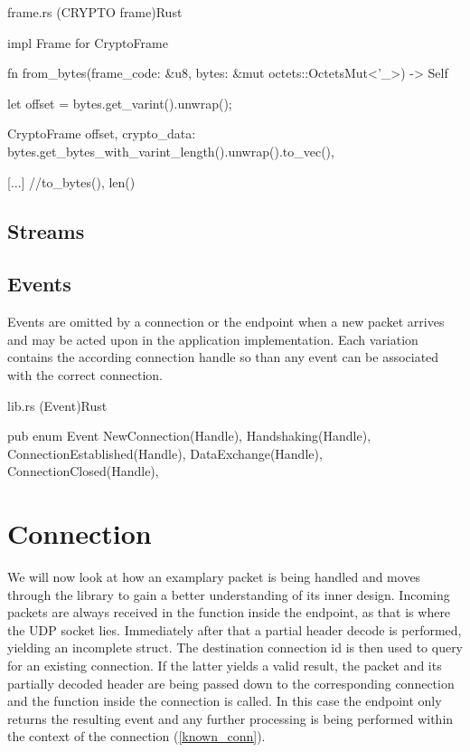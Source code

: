 \begin{codeblock}{frame.rs (CRYPTO frame)}{Rust}
    \begin{rustcode}
        impl Frame for CryptoFrame {
            fn from_bytes(frame_code: &u8, bytes: &mut octets::OctetsMut<'_>) -> Self {
                let offset = bytes.get_varint().unwrap();

                CryptoFrame {
                    offset,
                    crypto_data: bytes.get_bytes_with_varint_length().unwrap().to_vec(),
                }
            }

            [...] //to_bytes(), len()
        }
    \end{rustcode}
\end{codeblock}

\subsection{Streams}


\subsection{Events}

Events are omitted by a connection or the endpoint when a new packet arrives and may be acted upon in the application implementation. Each variation
contains the according connection handle so than any event can be associated with the correct connection. 

\begin{codeblock}{lib.rs (Event)}{Rust}
    \begin{rustcode}
        pub enum Event {
            NewConnection(Handle),
            Handshaking(Handle),
            ConnectionEstablished(Handle),
            DataExchange(Handle),
            ConnectionClosed(Handle),
        }
    \end{rustcode}
\end{codeblock}

\section{Connection}

We will now look at how an examplary packet is being handled and moves through the library to gain a better understanding of its inner
design. Incoming packets are always received in the  function inside the endpoint, as that is where the UDP socket lies.
Immediately after that a partial header decode is performed, yielding an incomplete  struct. The destination connection
id is then used to query for an existing connection. If the latter yields a valid result, the packet and its partially
decoded header are being passed down to the corresponding connection and the  function inside the connection is called.
In this case the endpoint only returns the resulting event and any further processing is being performed within the context of the
connection (\ref{known_conn}).

